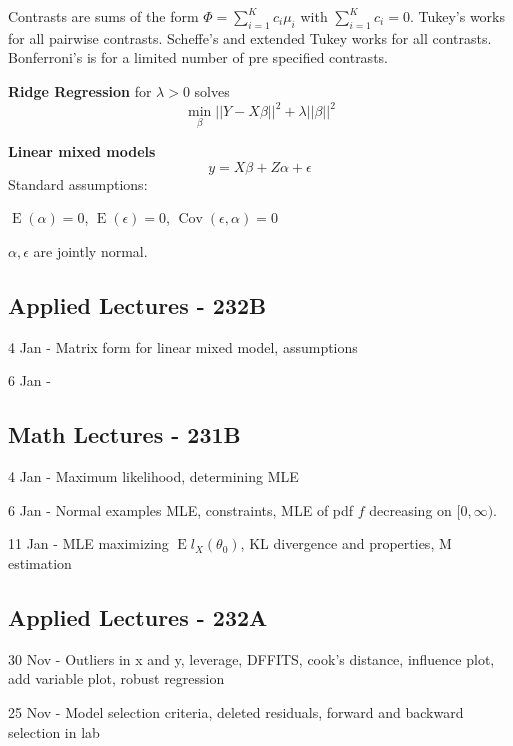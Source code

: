 \documentclass[10pt, twocolumn]{article}
\newcommand{\Expect}{\operatorname{E}}
\newcommand{\Cov}{\operatorname{Cov}}
\begin{document}
Contrasts are sums of the form $\Phi = \sum_{i=1}^K c_i \mu_i$ with
$\sum_{i=1}^K c_i = 0$.
Tukey's works for all pairwise contrasts.
Scheffe's and extended Tukey works for all contrasts.
Bonferroni's is for a limited number of pre specified contrasts.

\textbf{Ridge Regression} for $\lambda > 0$ solves
\[
    \min_\beta ||Y - X\beta||^2 + \lambda ||\beta||^2
\]

\newpage

\textbf{Linear mixed models}
\[
    y = X \beta + Z \alpha + \epsilon
\]
Standard assumptions:

$\Expect ( \alpha) = 0$, $\Expect ( \epsilon) = 0$,
$\Cov(\epsilon, \alpha) = 0$

$\alpha, \epsilon$ are jointly normal.

\newpage

\subsection*{Applied Lectures - 232B}

4 Jan - Matrix form for linear mixed model, assumptions

6 Jan - 

\subsection*{Math Lectures - 231B}

4 Jan - Maximum likelihood, determining MLE

6 Jan - Normal examples MLE, constraints, MLE of pdf $f$ decreasing on $[0,
    \infty)$.

11 Jan - MLE maximizing $\Expect l_X (\theta_0)$, KL divergence and
properties, M estimation

\newpage

\subsection*{Applied Lectures - 232A}

30 Nov - Outliers in x and y, leverage, DFFITS, cook's distance, influence
plot, add variable plot, robust regression

25 Nov - Model selection criteria, deleted residuals, forward and backward
selection in lab
\end{document}

